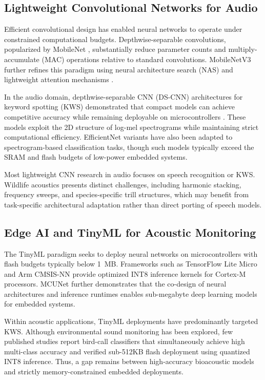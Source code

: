 \documentclass[final,5p,times,twocolumn,nolinenum]{elsarticle}
\begin{document}
\subsection{Lightweight Convolutional Networks for Audio}

Efficient convolutional design has enabled neural networks to operate under constrained computational budgets. Depthwise-separable convolutions, popularized by MobileNet \cite{howard2017mobilenets}, substantially reduce parameter counts and multiply-accumulate (MAC) operations relative to standard convolutions. MobileNetV3 further refines this paradigm using neural architecture search (NAS) and lightweight attention mechanisms \cite{howard2019searching}.

In the audio domain, depthwise-separable CNN (DS-CNN) architectures for keyword spotting (KWS) demonstrated that compact models can achieve competitive accuracy while remaining deployable on microcontrollers \cite{zhang2017hello}. These models exploit the 2D structure of log-mel spectrograms while maintaining strict computational efficiency. EfficientNet variants \cite{tan2019efficientnet} have also been adapted to spectrogram-based classification tasks, though such models typically exceed the SRAM and flash budgets of low-power embedded systems.

Most lightweight CNN research in audio focuses on speech recognition or KWS. Wildlife acoustics presents distinct challenges, including harmonic stacking, frequency sweeps, and species-specific trill structures, which may benefit from task-specific architectural adaptation rather than direct porting of speech models.

\subsection{Edge AI and TinyML for Acoustic Monitoring}

The TinyML paradigm seeks to deploy neural networks on microcontrollers with flash budgets typically below 1~MB. Frameworks such as TensorFlow Lite Micro \cite{david2021tensorflow} and Arm CMSIS-NN \cite{lai2018cmsis} provide optimized INT8 inference kernels for Cortex-M processors. MCUNet \cite{lin2020mcunet} further demonstrates that the co-design of neural architectures and inference runtimes enables sub-megabyte deep learning models for embedded systems.

Within acoustic applications, TinyML deployments have predominantly targeted KWS. Although environmental sound monitoring has been explored, few published studies report bird-call classifiers that simultaneously achieve high multi-class accuracy and verified sub-512KB flash deployment using quantized INT8 inference. Thus, a gap remains between high-accuracy bioacoustic models and strictly memory-constrained embedded deployments.
\end{document}
